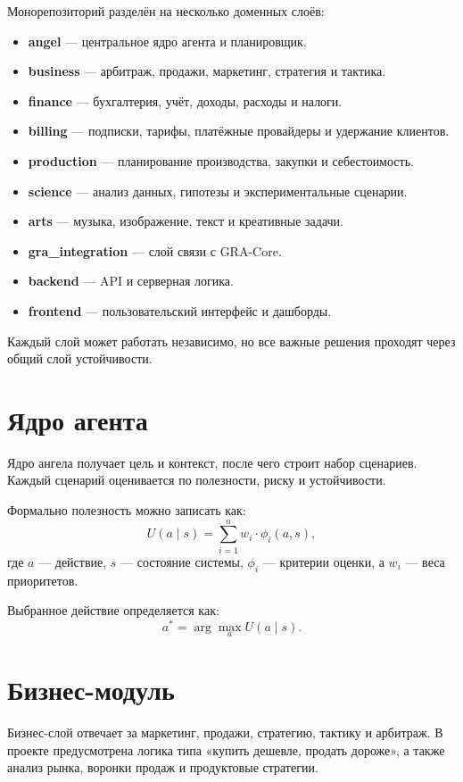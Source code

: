 \documentclass[11pt,a4paper]{article}
\begin{document}
Монорепозиторий разделён на несколько доменных слоёв:
\begin{itemize}[leftmargin=1.2cm]
    \item \textbf{angel} — центральное ядро агента и планировщик.
    \item \textbf{business} — арбитраж, продажи, маркетинг, стратегия и тактика.
    \item \textbf{finance} — бухгалтерия, учёт, доходы, расходы и налоги.
    \item \textbf{billing} — подписки, тарифы, платёжные провайдеры и удержание клиентов.
    \item \textbf{production} — планирование производства, закупки и себестоимость.
    \item \textbf{science} — анализ данных, гипотезы и экспериментальные сценарии.
    \item \textbf{arts} — музыка, изображение, текст и креативные задачи.
    \item \textbf{gra\_integration} — слой связи с GRA-Core.
    \item \textbf{backend} — API и серверная логика.
    \item \textbf{frontend} — пользовательский интерфейс и дашборды.
\end{itemize}

Каждый слой может работать независимо, но все важные решения проходят через общий слой устойчивости.

\section{Ядро агента}

Ядро ангела получает цель и контекст, после чего строит набор сценариев. Каждый сценарий оценивается по полезности, риску и устойчивости.

Формально полезность можно записать как:
\[
U(a \mid s) = \sum_{i=1}^{n} w_i \cdot \phi_i(a, s),
\]
где $a$ — действие, $s$ — состояние системы, $\phi_i$ — критерии оценки, а $w_i$ — веса приоритетов.

Выбранное действие определяется как:
\[
a^* = \arg\max_a U(a \mid s).
\]

\section{Бизнес-модуль}

Бизнес-слой отвечает за маркетинг, продажи, стратегию, тактику и арбитраж.  
В проекте предусмотрена логика типа «купить дешевле, продать дороже», а также анализ рынка, воронки продаж и продуктовые стратегии.
\end{document}
